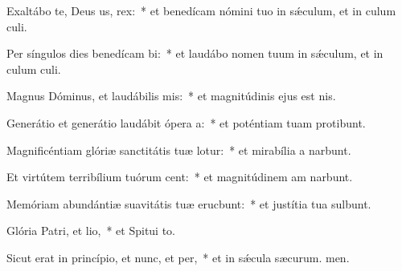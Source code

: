 \item Exaltábo te, Deus us, rex:~* et benedícam nómini tuo in sǽculum, et in culum culi.
\item Per síngulos dies benedícam bi:~* et laudábo nomen tuum in sǽculum, et in culum culi.
\item Magnus Dóminus, et laudábilis mis:~* et magnitúdinis ejus  est nis.
\item Generátio et generátio laudábit ópera a:~* et poténtiam tuam protibunt.
\item Magnificéntiam glóriæ sanctitátis tuæ lotur:~* et mirabília a narbunt.
\item Et virtútem terribílium tuórum cent:~* et magnitúdinem am narbunt.
\item Memóriam abundántiæ suavitátis tuæ erucbunt:~* et justítia tua sulbunt.
\item Glória Patri, et lio,~* et Spitui to.
\item Sicut erat in princípio, et nunc, et per,~* et in sǽcula sæcurum. men.
